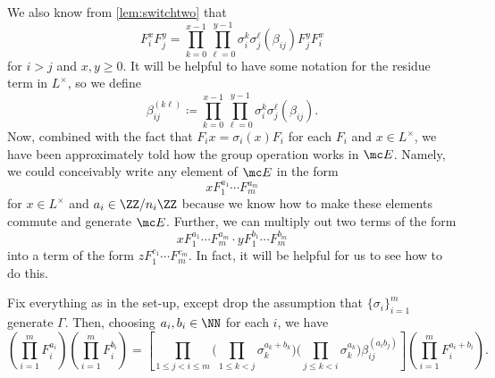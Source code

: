 \documentclass{article}
\numberwithin{equation}{section}
\begin{document}
We also know from \autoref{lem:switchtwo} that
\[F_i^xF_j^y=\prod_{k=0}^{x-1}\prod_{\ell=0}^{y-1}\sigma_i^k\sigma_j^\ell(\beta_{ij})F_j^yF_i^x\]
for $i>j$ and $x,y\ge0$. It will be helpful to have some notation for the residue term in $L^\times$, so we define
\[\beta_{ij}^{(k\ell)}\coloneqq\prod_{k=0}^{x-1}\prod_{\ell=0}^{y-1}\sigma_i^k\sigma_j^\ell(\beta_{ij}).\]
Now, combined with the fact that $F_ix=\sigma_i(x)F_i$ for each $F_i$ and $x\in L^\times$, we have been approximately told how the group operation works in $\mc E$. Namely, we could conceivably write any element of $\mc E$ in the form
\[xF_1^{a_1}\cdots F_m^{a_m}\]
for $x\in L^\times$ and $a_i\in\ZZ/n_i\ZZ$ because we know how to make these elements commute and generate $\mc E$. Further, we can multiply out two terms of the form
\[xF_1^{a_1}\cdots F_m^{a_m}\cdot yF_1^{b_1}\cdots F_m^{b_m}\]
into a term of the form $zF_1^{c_1}\cdots F_m^{c_m}$. In fact, it will be helpful for us to see how to do this.
\begin{proposition} \label{prop:multiplytwoelements}
	Fix everything as in the set-up, except drop the assumption that $\{\sigma_i\}_{i=1}^m$ generate $\Gamma$. Then, choosing $a_i,b_i\in\NN$ for each $i$, we have
	\[\left(\prod_{i=1}^mF_i^{a_i}\right)\left(\prod_{i=1}^mF_i^{b_i}\right)=\left[\prod_{1\le j<i\le m}\Bigg(\prod_{1\le k<j}\sigma_k^{a_k+b_k}\Bigg)\Bigg(\prod_{j\le k<i}\sigma_k^{a_k}\Bigg)\beta_{ij}^{(a_ib_j)}\right]\left(\prod_{i=1}^mF_i^{a_i+b_i}\right).\]
\end{proposition}
\end{document}
